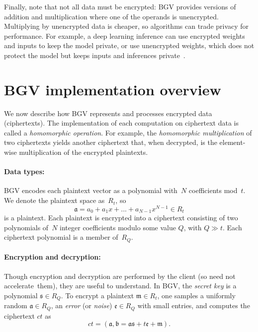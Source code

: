 Finally, note that not all data must be encrypted:
BGV provides versions of addition and multiplication where one of the operands is unencrypted.
Multiplying by unencrypted data is cheaper, so algorithms can trade privacy for performance.
For example, a deep learning inference can use encrypted weights and inputs to keep the model private,
or use unencrypted weights, which does not protect the model but keeps inputs and inferences private~\cite{brutzkus:icml19:low}.

\section{BGV implementation overview}
\label{sec:fhe_operation}

We now describe how BGV represents and processes encrypted data (ciphertexts).
The implementation of each computation on ciphertext data is called a \emph{homomorphic operation}.
For example, the \emph{homomorphic multiplication} of two ciphertexts yields another ciphertext that,
when decrypted, is the element-wise multiplication of the encrypted plaintexts.


\paragraph{Data types:}
BGV encodes each plaintext vector as a polynomial with~$N$ coefficients
mod~$t$.
We denote the plaintext space as~$R_t$, so
\vspace{-2pt}
\[\mathfrak{a} = a_0 + a_1x + ... + a_{N-1}x^{N-1} \in R_t\]
is a plaintext. Each plaintext is encrypted into a ciphertext consisting of two 
polynomials of~$N$ integer coefficients modulo some value $Q$, with $Q \gg t$.
Each ciphertext polynomial is a member of~$R_Q$.

\paragraph{Encryption and decryption:}
Though encryption and decryption are performed by the client (so \name need not accelerate~them),
they are useful to understand.
In BGV, the \textit{secret key} is a polynomial $\mathfrak{s} \in R_Q$.
To encrypt a plaintext $\mathfrak{m} \in R_t$, one samples a uniformly
random $\mathfrak{a} \in R_Q$, an \emph{error} (or \emph{noise}) $\mathfrak{e} \in R_Q$ with small entries,
and computes the ciphertext $ct$ as
\vspace{-2pt}
\begin{equation*}
  ct = (\mathfrak{a}, \mathfrak{b} = \mathfrak{a}\mathfrak{s} + t \mathfrak{e} + \mathfrak{m}).
\end{equation*}

